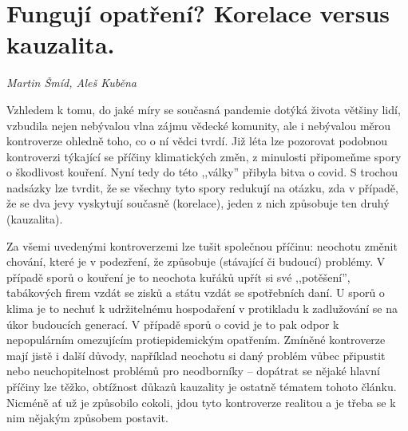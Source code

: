 
\chapter{Fungují opatření? Korelace versus kauzalita.} \label{Co_na_cem_zavisi}

\textit{Martin Šmíd, Aleš Kuběna}
\vspace{15mm}

Vzhledem k tomu, do jaké míry se současná pandemie dotýká života většiny lidí, vzbudila nejen nebývalou vlna zájmu vědecké komunity, ale i nebývalou měrou kontroverze ohledně toho, co o ní vědci tvrdí. Již léta lze pozorovat podobnou kontroverzi týkající se příčiny klimatických změn, z minulosti připomeňme spory o škodlivost kouření. Nyní tedy do této ,,války'' přibyla bitva o covid. S trochou nadsázky lze tvrdit, že se všechny tyto spory redukují na otázku, zda v případě, že se dva jevy vyskytují současně (korelace), jeden z nich způsobuje ten druhý (kauzalita).

Za všemi uvedenými kontroverzemi lze tušit společnou příčinu: neochotu změnit chování, které je v podezření,
že způsobuje (stávající či budoucí) problémy. V případě sporů o kouření je to neochota kuřáků upřít si své ,,potěšení'', tabákových firem vzdát se zisků a státu vzdát se spotřebních daní. U sporů o klima je to nechuť k udržitelnému hospodaření v protikladu k zadlužování se na úkor budoucích generací. V případě sporů o covid je to pak odpor k nepopulárním omezujícím protiepidemickým
opatřením. Zmíněné kontroverze mají jistě i další důvody, například neochotu si daný problém vůbec připustit nebo neuchopitelnost problémů pro neodborníky -- dopátrat se nějaké hlavní příčiny lze těžko, obtížnost důkazů kauzality je ostatně tématem tohoto článku. Nicméně ať už je způsobilo cokoli, jdou tyto kontroverze realitou a je třeba se k nim nějakým způsobem postavit.

